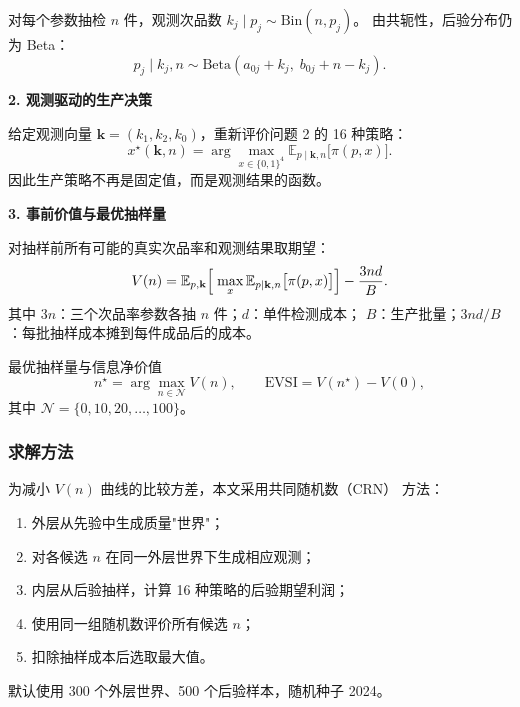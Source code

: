 \documentclass[withoutpreface,bwprint]{cumcmthesis}
\newcommand{\E}{\mathbb{E}}
\begin{document}
对每个参数抽检 $n$ 件，观测次品数 $k_j \mid p_j \sim \mathrm{Bin}(n, p_j)$。
由共轭性，后验分布仍为 Beta：
\begin{equation}
    p_j \mid k_j, n \sim \mathrm{Beta}(a_{0j} + k_j,\; b_{0j} + n - k_j).
\end{equation}

\textbf{2. 观测驱动的生产决策}

给定观测向量 $\mathbf{k} = (k_1, k_2, k_0)$，重新评价问题 2 的 16 种策略：
\begin{equation}
    x^\star(\mathbf{k}, n) = \arg\max_{x \in \{0,1\}^4}
    \E_{p \mid \mathbf{k}, n} \bigl[ \pi(p, x) \bigr].
    \label{eq:q4-obs}
\end{equation}
因此生产策略不再是固定值，而是观测结果的函数。

\textbf{3. 事前价值与最优抽样量}

对抽样前所有可能的真实次品率和观测结果取期望：
\begin{equation}
    V(n) = \E_{p, \mathbf{k}}\Bigl[\;
        \max_{x} \E_{p \mid \mathbf{k}, n} \bigl[ \pi(p, x) \bigr]
    \Bigr] - \frac{3 n d}{B}.
    \label{eq:q4-Vn}
\end{equation}
其中 $3n$：三个次品率参数各抽 $n$ 件；$d$：单件检测成本；
$B$：生产批量；$3nd / B$：每批抽样成本摊到每件成品后的成本。

最优抽样量与信息净价值
\begin{equation}
    n^\star = \arg\max_{n \in \mathcal{N}} V(n), \qquad
    \mathrm{EVSI} = V(n^\star) - V(0),
\end{equation}
其中 $\mathcal{N} = \{0, 10, 20, \ldots, 100\}$。

\subsubsection{求解方法}

为减小 $V(n)$ 曲线的比较方差，本文采用共同随机数（CRN）
方法：
\begin{enumerate}
    \item 外层从先验中生成质量"世界"；
    \item 对各候选 $n$ 在同一外层世界下生成相应观测；
    \item 内层从后验抽样，计算 16 种策略的后验期望利润；
    \item 使用同一组随机数评价所有候选 $n$；
    \item 扣除抽样成本后选取最大值。
\end{enumerate}
默认使用 300 个外层世界、500 个后验样本，随机种子 2024。
\end{document}
